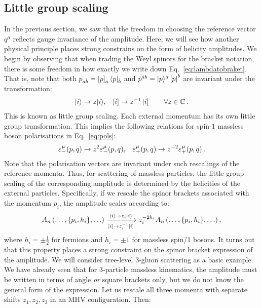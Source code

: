 \documentclass[main.tex]{subfiles}
\begin{document}
\subsection{Little group scaling} \label{sec:littlegroup}
In the previous section, we saw that the freedom in choosing the reference vector $q^\mu$ reflects gauge invariance of the amplitude. Here, we will see how another physical principle places strong constrains on the form of helicity amplitudes. We begin by observing that when trading the Weyl spinors for the bracket notation, there is some freedom in how exactly we write down Eq.~\ref{eq:lambdatobraket}. That is, note that both $p_{a\dot{b}} = \left| p \right]_a \langle p|_{\dot{b}}$ and $p^{\dot{a}b} = |p \rangle^{\dot{a}} \left[ p \right|^b$ are invariant under the transformation:
\begin{align} \label{eq:littlegroupscaling}
    |i \rangle \rightarrow z |i \rangle, && \left| i \right] \rightarrow z^{-1} \left| i \right] \qquad \forall z \in \mathbb{C}\,.  
\end{align}
This is known as little group scaling. Each external momentum has its own little group transformation. This implies the following relations for spin-$1$ massless boson polarisations in Eq.~\ref{eq:pols}:
\begin{align}
    \varepsilon^\mu_- (p,q) \rightarrow z^2 \varepsilon^\mu_- (p,q), &&  \varepsilon^\mu_+ (p,q) \rightarrow z^{-2} \varepsilon^\mu_+ (p,q) \,.
\end{align}
Note that the polarisation vectors are invariant under such rescalings of the reference momenta. Thus, for scattering of massless particles, the little group scaling of the corresponding amplitude is determined by the helicities of the external particles. Specifically, if we rescale the spinor brackets associated with the momentum $p_i$, the amplitude scales according to:
\begin{equation}
    A_n \left(\ldots, \{p_i, h_i\}, \ldots \right) \xrightarrow[\ketsq{i} \rightarrow z_i^{-1}\ketsq{i}]{\ket{i} \rightarrow z_i\ket{i}} z_i^{-2h_i}  A_n \left(\ldots, \{p_i, h_i\}, \ldots \right),
\end{equation}
where $h_i=\pm\frac{1}{2}$ for fermions and $h_i=\pm1$ for massless spin\=/1 bosons. It turns out that this property places a strong constraint on the spinor bracket expression of the amplitude. We will consider tree-level 3-gluon scattering as a basic example. We have already seen that for 3-particle massless kinematics, the amplitude must be written in terms of angle \textit{or} square brackets only, but we do not know the general form of the expression. Let us rescale all three momenta with separate shifts $z_1, z_2, z_3$ in an MHV configuration. Then:
\end{document}

